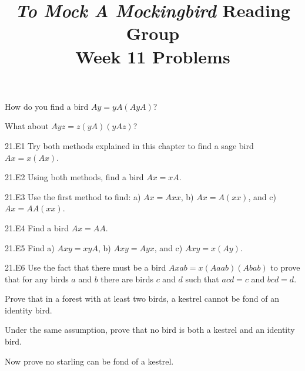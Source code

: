\documentclass[12pt, letterpaper]{article}
\title{\emph{To Mock A Mockingbird} Reading Group\\Week 11 Problems}
\begin{document}
\maketitle

\begin{prob}{21.1}  
How do you find a bird $Ay = yA(AyA)$?
\end{prob}

\begin{prob}{21.2}  
What about $Ayz = z(yA)(yAz)$?
\end{prob}

\begin{prob}{21.E1} 
Try both methods explained in this chapter to find a sage bird $Ax = x(Ax)$.
\end{prob}

\begin{prob}{21.E2} 
Using both methods, find a bird $Ax = xA$.
\end{prob}

\begin{prob}{21.E3} 
Use the first method to find: a) $Ax = Axx$, b) $Ax = A(xx)$, and c) $Ax = AA(xx)$.
\end{prob}

\begin{prob}{21.E4} 
Find a bird $Ax = AA$.
\end{prob}

\begin{prob}{21.E5} 
Find a) $Axy = xyA$, b) $Axy = Ayx$, and c) $Axy = x(Ay)$.
\end{prob}

\begin{prob}{21.E6} 
Use the fact that there must be a bird $Axab = x(Aaab)(Abab)$ to prove that for any birds $a$ and $b$ there are birds $c$ and $d$ such that $acd = c$ and $bcd = d$.
\end{prob}

\begin{prob}{22.1}  
Prove that in a forest with at least two birds, a kestrel cannot be fond of an identity bird.
\end{prob}

\begin{prob}{22.2}  
Under the same assumption, prove that no bird is both a kestrel and an identity bird.
\end{prob}

\begin{prob}{22.3}  
Now prove no starling can be fond of a kestrel.
\end{prob}
\end{document}
